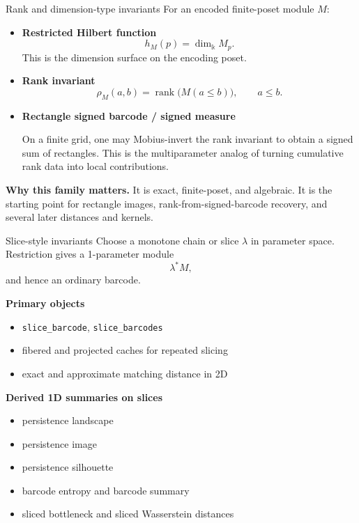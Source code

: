 \documentclass[aspectratio=169,11pt]{beamer}
\newcommand{\kk}{\Bbbk}
\begin{document}
\begin{frame}{Rank and dimension-type invariants}
\small
For an encoded finite-poset module $M$:
\begin{itemize}
  \item \textbf{Restricted Hilbert function}
  \[
    h_M(p)=\dim_{\kk} M_p.
  \]
  This is the dimension surface on the encoding poset.
  \item \textbf{Rank invariant}
  \[
    \rho_M(a,b)=\operatorname{rank}\bigl(M(a\le b)\bigr),\qquad a\le b.
  \]
  \item \textbf{Rectangle signed barcode / signed measure}

  On a finite grid, one may Mobius-invert the rank invariant to obtain a signed sum of rectangles.
  This is the multiparameter analog of turning cumulative rank data into local contributions.
\end{itemize}

\medskip
\textbf{Why this family matters.}
It is exact, finite-poset, and algebraic.  It is the starting point for rectangle images,
rank-from-signed-barcode recovery, and several later distances and kernels.
\end{frame}

\begin{frame}{Slice-style invariants}
\small
Choose a monotone chain or slice $\lambda$ in parameter space.  Restriction gives a 1-parameter module
\[
  \lambda^* M,
\]
and hence an ordinary barcode.

\medskip
\textbf{Primary objects}
\begin{itemize}
  \item \texttt{slice\_barcode}, \texttt{slice\_barcodes}
  \item fibered and projected caches for repeated slicing
  \item exact and approximate matching distance in 2D
\end{itemize}

\textbf{Derived 1D summaries on slices}
\begin{itemize}
  \item persistence landscape
  \item persistence image
  \item persistence silhouette
  \item barcode entropy and barcode summary
  \item sliced bottleneck and sliced Wasserstein distances
\end{itemize}

\end{frame}
\end{document}
